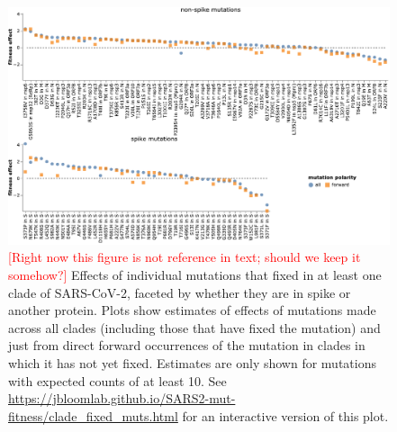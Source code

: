 \documentclass[9pt,twocolumn,twoside]{gsajnl_modified}
\newcommand\jdbcomment[1]{\textcolor{red}{[#1]}}
\begin{document}
\begin{figure}[b]
\includegraphics[width=\linewidth]{figs/fixed.pdf}
\caption{
\jdbcomment{Right now this figure is not reference in text; should we keep it somehow?}
Effects of individual mutations that fixed in at least one clade of SARS-CoV-2, faceted by whether they are in spike or another protein.
Plots show estimates of effects of mutations made across all clades (including those that have fixed the mutation) and just from direct forward occurrences of the mutation in clades in which it has not yet fixed.
Estimates are only shown for mutations with expected counts of at least 10.
See \url{https://jbloomlab.github.io/SARS2-mut-fitness/clade_fixed_muts.html} for an interactive version of this plot.
\label{fig:fixed}
}
\end{figure}
\end{document}
